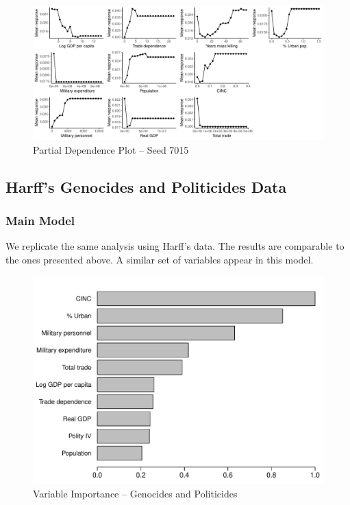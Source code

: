 \documentclass[a4paper,12pt]{article}
\begin{document}
\newpage

\begin{figure}[H]
    \centering
    \includegraphics[width=.98\textheight,angle=90]{images/rf-mk-7015-pd.pdf}
    \caption{Partial Dependence Plot -- Seed 7015}
    \label{fig:rf-mk-4363}
\end{figure}

\newpage

\subsection{Harff's Genocides and Politicides Data}

\subsubsection{Main Model}

We replicate the same analysis using Harff's \citeyear{harff2003no} data. The results are comparable to the ones presented above. A similar set of variables appear in this model.

\begin{figure}[H]
    \centering
    \includegraphics{images/rf-uamk.pdf}
    \caption{Variable Importance -- Genocides and Politicides}
    \label{fig:rf-mk-4363}
\end{figure}
\end{document}
